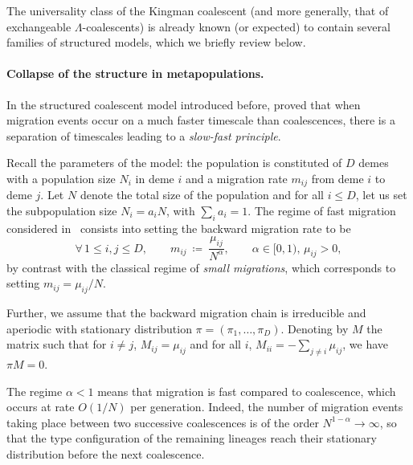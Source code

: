  The universality class of the Kingman coalescent (and more generally, that of exchangeable $\Lambda$-coalescents) is already known (or expected) to contain several families of structured models, which we briefly review below.

\paragraph{Collapse of the structure in metapopulations.}
In the structured coalescent model introduced before, \citet*{nordborg_separation_2002} proved that when migration
events occur on a much faster timescale than coalescences, there is a separation of
timescales leading to a \emph{slow-fast principle}. 

Recall the parameters of the model: the population is constituted of $D$ demes with a population size $N_i$ in deme $i$ and a migration rate $m_{ij}$ from deme $i$ to deme $j$.
Let $N$ denote the total size of the population and for all $i\leq D$, let us set the  subpopulation size $N_i = a_i N$, with
$\sum_i a_i = 1$. The regime of fast migration considered in~\cite{nordborg_separation_2002} consists into setting the backward migration rate to be 
\[
\forall\, 1\leq i,j\leq D,\qquad m_{ij}\ \coloneqq\ \frac{\mu_{ij}}{N^{\alpha}},\qquad \alpha\in[0,1),\, \mu_{ij}>0,
\] 
by contrast with the classical regime of \emph{small migrations}, which corresponds to setting $m_{ij} = \mu_{ij}/N$.

Further, we assume that the backward migration chain is irreducible and aperiodic with stationary
distribution $\pi = (\pi_1,\dots,\pi_D)$. Denoting by $M$ the matrix such that for $i\neq j$, $M_{ij}= \mu_{ij}$ and for all $i$, $M_{ii} = -\sum_{j\neq i}\mu_{ij}$, we have $\pi M=0$. 

The regime $\alpha<1$ means that migration is fast compared to coalescence, which occurs at rate $O(1/N)$ per generation. Indeed, the number of migration events taking place between two successive
coalescences is of the order $N^{1-\alpha}\to\infty$, so that the type configuration of the remaining  lineages reach their stationary distribution before the next coalescence. 

